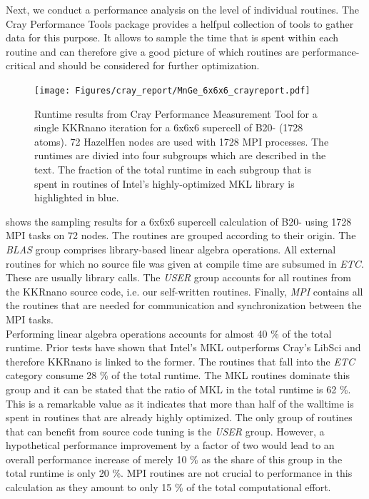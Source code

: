 \documentclass [a4paper, 12pt]{article}
\begin{document}
Next, we conduct a performance analysis on the level of individual routines.
The Cray Performance Tools package provides a helfpul collection of tools to gather data for this purpose.
It allows to sample the time that is spent within each routine and can therefore give a good
picture of which routines are performance-critical and should be considered for further optimization.
\\
\begin{figure}[h]
\begin{center}
 \texttt{[image: Figures/cray\_report/MnGe\_6x6x6\_crayreport.pdf]}
\end{center}
	\caption{Runtime results from Cray Performance Measurement Tool for a single KKRnano iteration 
	for a 6x6x6 supercell of B20- (1728 atoms). 72 HazelHen nodes are used with 1728 MPI processes.
	The runtimes are divied into four subgroups which are described in the text.
	The fraction of the total runtime in each subgroup that is spent in
	routines of Intel's highly-optimized MKL library is highlighted in blue.
	}
\label{fig:MnGe_6x6x6_crayreport}
\end{figure}
 shows the sampling results for a 6x6x6 supercell calculation
of B20- using 1728 MPI tasks on 72 nodes.
The routines are grouped according to their origin. The \textit{BLAS} group comprises
library-based linear algebra operations. 
All external routines for which no source file was given at compile time are subsumed
in \textit{ETC}. These are usually library calls.
The \textit{USER} group accounts for all routines from the KKRnano source code, i.e. our self-written routines.
Finally, \textit{MPI} contains all the routines that are needed for communication and synchronization
between the MPI tasks. 
\\
Performing linear algebra operations accounts for almost 40 \% of the total runtime. Prior tests have shown that
Intel's MKL outperforms Cray's LibSci and therefore KKRnano is linked to the former.
The routines that fall into the \textit{ETC} category consume 28 \% of the total runtime. 
The MKL routines dominate this group and it can be stated that the ratio of MKL in the total runtime is 62 \%.
This is a remarkable value as it indicates that more than half of the walltime is spent in routines
that are already highly optimized.
The only group of routines that can benefit from source code tuning is the \textit{USER} group.
However, a hypothetical performance improvement by a factor of two would lead to
an overall performance increase of merely 10 \% as the share of this group in the total runtime is only 20 \%.
MPI routines are not crucial to performance in this calculation as they amount to only 15 \% of the total
computational effort.
\end{document}
